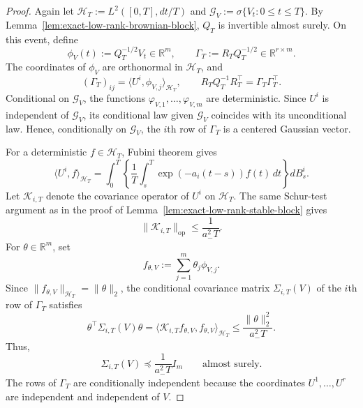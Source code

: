 \documentclass[10pt,a4paper]{amsart}
\begin{document}
\begin{proof}
Again let $\mathcal H_T:=L^2([0,T],dt/T)$ and $\mathcal G_V:=\sigma\{V_t:0\leq t\leq T\}$. By
Lemma~\ref{lem:exact-low-rank-brownian-block}, $Q_T$ is invertible almost
surely. On this event, define
\[
    \phi_V(t):=Q_T^{-1/2}V_t\in\mathbb R^m,
    \qquad
    \Gamma_T:=R_TQ_T^{-1/2}\in\mathbb R^{r\times m}.
\]
The coordinates of $\phi_V$ are orthonormal in $\mathcal H_T$, and
\begin{equation}
    (\Gamma_T)_{ij}=\langle U^i,\phi_{V,j}\rangle_{\mathcal H_T},
    \qquad
    R_TQ_T^{-1}R_T^\top=\Gamma_T\Gamma_T^\top.
\label{eq:exact-low-rank-cross-representation}
\end{equation}
Conditional on $\mathcal G_V$, the functions
$\varphi_{V,1},\ldots,\varphi_{V,m}$ are deterministic. Since $U^i$ is
independent of $\mathcal G_V$, its conditional law given $\mathcal G_V$
coincides with its unconditional law. Hence, conditionally on
$\mathcal G_V$, the $i$th row of $\Gamma_T$ is a centered Gaussian vector.

For a deterministic $f\in\mathcal H_T$, Fubini theorem gives
\begin{equation}
    \langle U^i,f\rangle_{\mathcal H_T}
    =\int_0^T\left\{
        \frac1T\int_s^T \exp(-a_i(t-s))f(t)\,dt
    \right\}dB_s^i.
\label{eq:exact-low-rank-ito-functional}
\end{equation}
Let $\mathcal K_{i,T}$ denote the covariance operator of $U^i$ on
$\mathcal H_T$. The same Schur-test argument as in the proof of
Lemma~\ref{lem:exact-low-rank-stable-block} gives
\[
    \|\mathcal K_{i,T}\|_{\mathrm{op}}\leq\frac1{a_-^2T}.
\]
For $\theta\in\mathbb R^m$, set
\[
    f_{\theta,V}:=\sum_{j=1}^m\theta_j\phi_{V,j}.
\]
Since $\|f_{\theta,V}\|_{\mathcal H_T}=\|\theta\|_2$, the conditional
covariance matrix $\Sigma_{i,T}(V)$ of the $i$th row of $\Gamma_T$ satisfies
\[
    \theta^\top\Sigma_{i,T}(V)\theta
    =\langle\mathcal K_{i,T}f_{\theta,V},f_{\theta,V}\rangle_{\mathcal H_T}
    \leq\frac{\|\theta\|_2^2}{a_-^2T}.
\]
Thus,
\begin{equation}
    \Sigma_{i,T}(V)\preceq\frac1{a_-^2T}I_m
    \qquad\text{almost surely}.
\label{eq:exact-low-rank-row-covariance-bound}
\end{equation}
The rows of $\Gamma_T$ are conditionally independent because the coordinates
$U^1,\ldots,U^r$ are independent and independent of $V$.


\end{proof}
\end{document}
